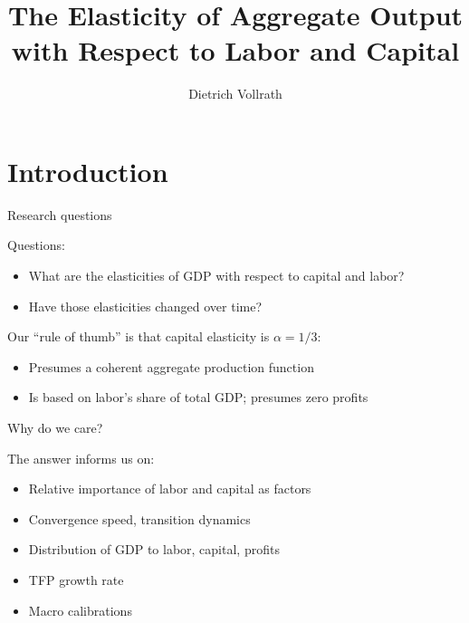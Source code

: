 \documentclass[10pt,xcolor=dvipsnames]{beamer}
\title[Aggregate elasticities]{The Elasticity of Aggregate Output \\ with Respect to Labor and Capital}
\author[Vollrath]{Dietrich Vollrath}
\institute[UH]{University of Houston}
\date[January 2024]{}
\begin{document}
\maketitle

\section{Introduction}

\begin{frame}{Research questions}\label{define}

Questions:
\begin{itemize}
  \item What are the elasticities of GDP with respect to capital and labor?
  \item Have those elasticities changed over time?
\end{itemize}

\pause
\vspace{.25in}
Our ``rule of thumb'' is that capital elasticity is $\alpha = 1/3$:
\begin{itemize}
  \item Presumes a coherent aggregate production function
  \item Is based on labor's share of total GDP; presumes zero profits
\end{itemize}

\end{frame}


\begin{frame}{Why do we care?}

The answer informs us on:
\begin{itemize}
  \item Relative importance of labor and capital as factors
  \item Convergence speed, transition dynamics
  \item Distribution of GDP to labor, capital, profits
  \item TFP growth rate
  \item Macro calibrations
\end{itemize}

\end{frame}
\end{document}
